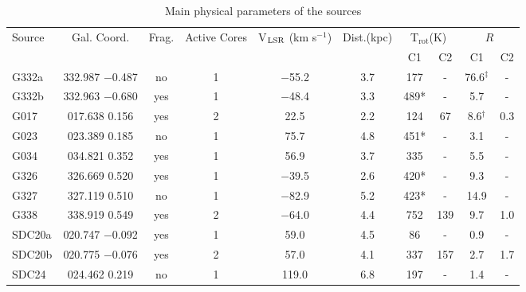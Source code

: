 \documentclass[baaa]{baaa}
\begin{document}
\begin{table*}[tt]
\caption{Main physical parameters of the sources}
\label{datos}
\tiny
\centering
\begin{tabular}{lccccccccc}
\hline
Source & Gal. Coord. &Frag. & Active Cores & V$_{\rm LSR}$ (km s$^{-1}$)     & Dist.(kpc)   &  \multicolumn{2}{c}{T$_\mathrm{rot}$(K)} & \multicolumn{2}{c}{$R$} \\ 
       \cline{7-10}
     &        &       &              &                  &        &  C1 & C2 &   C1 & C2   \\
\hline
G332a  & 332.987 $-$0.487 & no                  & 1                     & $-$55.2               & 3.7              & 177  & -      & 76.6$^\ddagger$ &  -   \\
G332b  & 332.963 $-$0.680 & yes                 & 1                     & $-$48.4               & 3.3              & 489* & -      & 5.7            &  -   \\
G017   & 017.638  0.156 & yes                 & 2                     & 22.5                & 2.2              & 124  & 67     & 8.6$^\dagger$  &  0.3 \\
G023   & 023.389  0.185 & no                  & 1                     & 75.7                & 4.8              & 451* & -      & 3.1            & - \\
G034   & 034.821  0.352 & yes                 & 1                     & 56.9                & 3.7              & 335  & -      & 5.5            & - \\
G326   & 326.669  0.520 & yes                 & 1                     & $-$39.5               & 2.6              & 420* & -      & 9.3            & - \\
G327   & 327.119  0.510 & no                  & 1                     & $-$82.9               & 5.2              & 423* & -      & 14.9           & - \\
G338   & 338.919  0.549 & yes                 & 2                     & $-$64.0               & 4.4              & 752  & 139    &  9.7           & 1.0  \\
SDC20a & 020.747 $-$0.092 & yes                 & 1                     & 59.0                & 4.5              & 86   & -      & 0.9            & - \\
SDC20b & 020.775 $-$0.076 & yes                 & 2                     & 57.0                & 4.1              & 337  & 157    & 2.7            & 1.7  \\
SDC24  & 024.462  0.219 & no                  & 1                     & 119.0               & 6.8              & 197  & -      &1.4             & -  \\

\end{tabular}
\end{table*}
\end{document}
